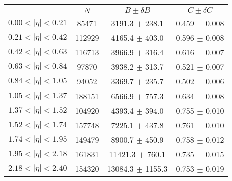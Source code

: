 \begin{tabular}{lccc}
\hline
    &   $N$   & $B \pm \delta B$  &  $C \pm \delta C$ \\
\hline
$0.00 < |\eta| <0.21$          & 85471      & 3191.3     $\pm$ 238.1 & 0.459      $\pm$ 0.008 \\
$0.21 < |\eta| <0.42$          & 112929     & 4165.4     $\pm$ 403.0 & 0.596      $\pm$ 0.008 \\
$0.42 < |\eta| <0.63$          & 116713     & 3966.9     $\pm$ 316.4 & 0.616      $\pm$ 0.007 \\
$0.63 < |\eta| <0.84$          & 97870      & 3938.2     $\pm$ 313.7 & 0.521      $\pm$ 0.007 \\
$0.84 < |\eta| <1.05$          & 94052      & 3369.7     $\pm$ 235.7 & 0.502      $\pm$ 0.006 \\
$1.05 < |\eta| <1.37$          & 188151     & 6566.9     $\pm$ 757.3 & 0.634      $\pm$ 0.008 \\
$1.37 < |\eta| <1.52$          & 104920     & 4393.4     $\pm$ 394.0 & 0.755      $\pm$ 0.010 \\
$1.52 < |\eta| <1.74$          & 157748     & 7225.1     $\pm$ 437.8 & 0.761      $\pm$ 0.010 \\
$1.74 < |\eta| <1.95$          & 149479     & 8900.7     $\pm$ 450.9 & 0.758      $\pm$ 0.012 \\
$1.95 < |\eta| <2.18$          & 161831     & 11421.3    $\pm$ 760.1 & 0.735      $\pm$ 0.015 \\
$2.18 < |\eta| <2.40$          & 154320     & 13084.3    $\pm$ 1155.3 & 0.753      $\pm$ 0.019 \\
\hline
\end{tabular}
